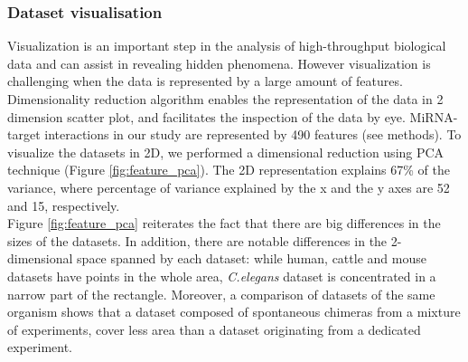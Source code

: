 \documentclass{bmcart}
\begin{document}

\subsubsection*{Dataset visualisation}
Visualization is an important step in the analysis of high-throughput biological data and can assist in revealing hidden phenomena. However visualization is challenging when the data is represented by a large amount of features. Dimensionality reduction algorithm enables the representation of the data in 2 dimension scatter plot, and facilitates the inspection of the data by eye. MiRNA-target interactions in our study are represented by 490 features (see methods). To visualize the datasets in 2D, we performed a dimensional reduction using PCA technique (Figure \ref{fig:feature_pca}). The 2D representation explains 67\% of the variance, where percentage of variance explained by the x and the y axes are 52 and 15, respectively. 
\\Figure \ref{fig:feature_pca} reiterates the fact that there are big differences in the sizes of the datasets. In addition, there are notable differences in the 2-dimensional space spanned by each dataset: while human, cattle and mouse datasets have points in the whole area, \textit{C.elegans} dataset is concentrated in a narrow part of the rectangle. Moreover, a comparison of datasets of the same organism shows that a dataset composed of spontaneous chimeras from a mixture of experiments, cover less area than a dataset originating from a dedicated experiment.
\end{document}
